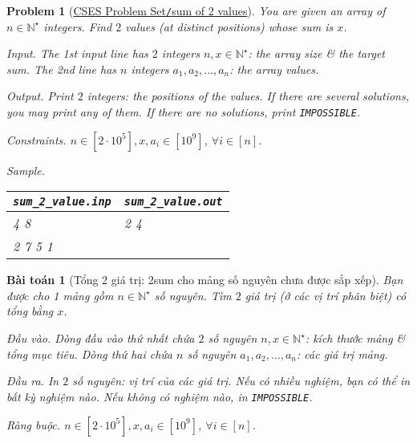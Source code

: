 \documentclass{article}
\newtheorem{baitoan}{Bài toán}
\newtheorem{problem}{Problem}
\begin{document}
\begin{problem}[\href{https://cses.fi/problemset/task/1640}{CSES Problem Set{\tt/}sum of 2 values}]
    You are given an array of $n\in\mathbb{N}^\star$ integers. Find $2$ values (at distinct positions) whose sum is $x$.
    \item {\sf Input.} The 1st input line has $2$ integers $n,x\in\mathbb{N}^\star$: the array size \& the target sum. The 2nd line has $n$ integers $a_1,a_2,\ldots,a_n$: the array values.
    \item {\sf Output.} Print $2$ integers: the positions of the values. If there are several solutions, you may print any of them. If there are no solutions, print {\tt IMPOSSIBLE}.
    \item {\sf Constraints.} $n\in[2\cdot10^5],x,a_i\in[10^9]$, $\forall i\in[n]$.
    \item {\sf Sample.}
    \begin{table}[H]
        \centering
        \begin{tabular}{|l|l|}
            \hline
            \verb|sum_2_value.inp| & \verb|sum_2_value.out| \\
            \hline
            4 8 & 2 4 \\
            2 7 5 1 & \\
            \hline
        \end{tabular}
    \end{table}
\end{problem}

\begin{baitoan}[Tổng 2 giá trị: {\sc2sum} cho mảng số nguyên chưa được sắp xếp]
    Bạn được cho 1 mảng gồm $n\in\mathbb{N}^\star$ số nguyên. Tìm $2$ giá trị (ở các vị trí phân biệt) có tổng bằng $x$.
    \item {\sf Đầu vào.} Dòng đầu vào thứ nhất chứa $2$ số nguyên $n,x\in\mathbb{N}^\star$: kích thước mảng \& tổng mục tiêu. Dòng thứ hai chứa $n$ số nguyên $a_1,a_2,\ldots,a_n$: các giá trị mảng.
    \item {\sf Đầu ra.} In $2$ số nguyên: vị trí của các giá trị. Nếu có nhiều nghiệm, bạn có thể in bất kỳ nghiệm nào. Nếu không có nghiệm nào, in {\tt IMPOSSIBLE}.
    \item {\sf Ràng buộc.} $n\in[2\cdot10^5],x,a_i\in[10^9]$, $\forall i\in[n]$.
\end{baitoan}
\end{document}

